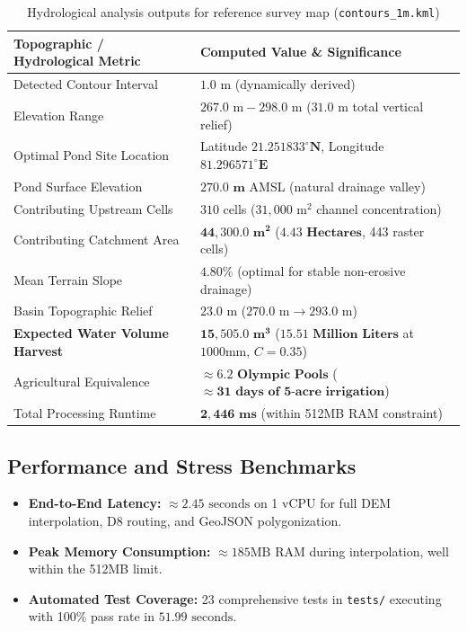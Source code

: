 \documentclass[manuscript,screen,review]{acmart}
\begin{document}
\begin{table}[h]
  \centering
  \caption{Hydrological analysis outputs for reference survey map (\texttt{contours\_1m.kml})}
  \label{tab:results}
  \small
  \begin{tabular}{ll}
    \toprule
    \textbf{Topographic / Hydrological Metric} & \textbf{Computed Value \& Significance} \\
    \midrule
    Detected Contour Interval & $1.0\text{ m}$ (dynamically derived) \\
    Elevation Range & $267.0\text{ m} - 298.0\text{ m}$ ($31.0\text{ m}$ total vertical relief) \\
    Optimal Pond Site Location & Latitude $\mathbf{21.251833^\circ\text{N}}$, Longitude $\mathbf{81.296571^\circ\text{E}}$ \\
    Pond Surface Elevation & $\mathbf{270.0\text{ m}}$ AMSL (natural drainage valley) \\
    Contributing Upstream Cells & $310$ cells ($31,000\text{ m}^2$ channel concentration) \\
    Contributing Catchment Area & $\mathbf{44,300.0\text{ m}^2}$ ($\mathbf{4.43\text{ Hectares}}$, 443 raster cells) \\
    Mean Terrain Slope & $4.80\%$ (optimal for stable non-erosive drainage) \\
    Basin Topographic Relief & $23.0\text{ m}$ ($270.0\text{ m} \rightarrow 293.0\text{ m}$) \\
    \textbf{Expected Water Volume Harvest} & $\mathbf{15,505.0\text{ m}^3}$ ($\mathbf{15.51\text{ Million Liters}}$ at $1000\text{mm}$, $C=0.35$) \\
    Agricultural Equivalence & $\approx \mathbf{6.2\text{ Olympic Pools}}$ ($\approx \mathbf{31\text{ days of 5-acre irrigation}}$) \\
    Total Processing Runtime & $\mathbf{2,446\text{ ms}}$ (within 512MB RAM constraint) \\
    \bottomrule
  \end{tabular}
\end{table}

\subsection{Performance and Stress Benchmarks}
\begin{itemize}[noitemsep]
    \item \textbf{End-to-End Latency:} $\approx 2.45\text{ seconds}$ on 1 vCPU for full DEM interpolation, D8 routing, and GeoJSON polygonization.
    \item \textbf{Peak Memory Consumption:} $\approx 185\text{MB}$ RAM during interpolation, well within the 512MB limit.
    \item \textbf{Automated Test Coverage:} 23 comprehensive tests in \texttt{tests/} executing with 100\% pass rate in $51.99\text{ seconds}$.
\end{itemize}
\end{document}
